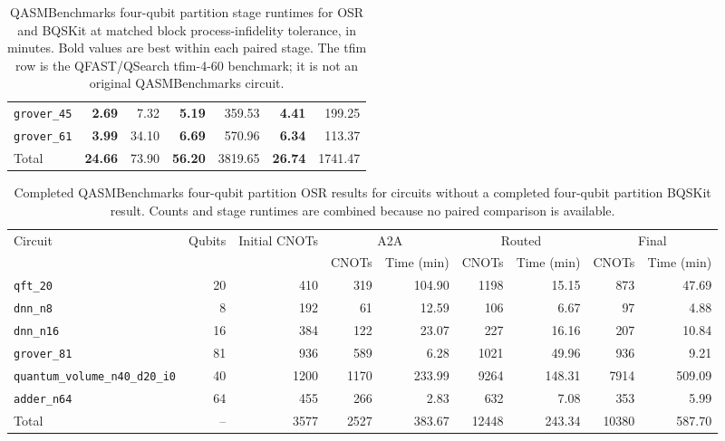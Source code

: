 \begin{table}[p]
\begin{tabular}{l|rrr|rrr}
\texttt{grover\_45} & \textbf{2.69} & 7.32 & \textbf{5.19} & 359.53 & \textbf{4.41} & 199.25 \\
\texttt{grover\_61} & \textbf{3.99} & 34.10 & \textbf{6.69} & 570.96 & \textbf{6.34} & 113.37 \\
\hline
Total & \textbf{24.66} & 73.90 & \textbf{56.20} & 3819.65 & \textbf{26.74} & 1741.47 \\
\hline
\end{tabular}
\caption{QASMBenchmarks four-qubit partition stage runtimes for OSR and BQSKit at matched block process-infidelity tolerance, in minutes. Bold values are best within each paired stage. The tfim row is the QFAST/QSearch tfim-4-60 benchmark; it is not an original QASMBenchmarks circuit.}
\label{tab:osr-bqskit-four-qubit-qasm-benchmarks-times}
\end{table}

\begin{table}[p]
\centering
\scriptsize
\begin{tabular}{lrr|rr|rr|rr}
\hline
Circuit & Qubits & Initial CNOTs & \multicolumn{2}{c|}{A2A} & \multicolumn{2}{c|}{Routed} & \multicolumn{2}{c}{Final} \\
 & & & CNOTs & Time (min) & CNOTs & Time (min) & CNOTs & Time (min) \\
\hline
\texttt{qft\_20} & 20 & 410 & 319 & 104.90 & 1198 & 15.15 & 873 & 47.69 \\
\texttt{dnn\_n8} & 8 & 192 & 61 & 12.59 & 106 & 6.67 & 97 & 4.88 \\
\texttt{dnn\_n16} & 16 & 384 & 122 & 23.07 & 227 & 16.16 & 207 & 10.84 \\
\texttt{grover\_81} & 81 & 936 & 589 & 6.28 & 1021 & 49.96 & 936 & 9.21 \\
\texttt{quantum\_volume\_n40\_d20\_i0} & 40 & 1200 & 1170 & 233.99 & 9264 & 148.31 & 7914 & 509.09 \\
\texttt{adder\_n64} & 64 & 455 & 266 & 2.83 & 632 & 7.08 & 353 & 5.99 \\
\hline
Total & -- & 3577 & 2527 & 383.67 & 12448 & 243.34 & 10380 & 587.70 \\
\hline
\end{tabular}
\caption{Completed QASMBenchmarks four-qubit partition OSR results for circuits without a completed four-qubit partition BQSKit result. Counts and stage runtimes are combined because no paired comparison is available.}
\label{tab:osr-four-qubit-unpaired-qasm-benchmarks}
\end{table}


